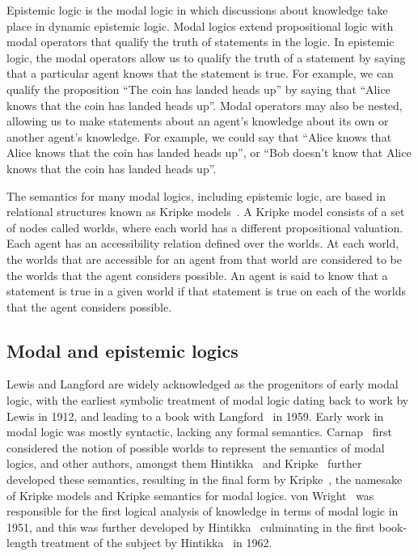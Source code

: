 Epistemic logic is the modal logic in which discussions about knowledge take
place in dynamic epistemic logic. Modal logics extend propositional logic with
modal operators that qualify the truth of statements in the logic. In epistemic
logic, the modal operators allow us to qualify the truth of a statement by
saying that a particular agent knows that the statement is true. For example, we
can qualify the proposition ``The coin has landed heads up'' by saying that
``Alice knows that the coin has landed heads up''. Modal operators may also be
nested, allowing us to make statements about an agent's knowledge about its own
or another agent's knowledge. For example, we could say that ``Alice knows that
Alice knows that the coin has landed heads up'', or ``Bob doesn't know that
Alice knows that the coin has landed heads up''.

The semantics for many modal logics, including epistemic logic, are based in
relational structures known as Kripke models~\cite{kripke:1963,blackburn:2001}. A
Kripke model consists of a set of nodes called worlds, where each world has a
different propositional valuation. Each agent has an accessibility relation
defined over the worlds. At each world, the worlds that are accessible for an
agent from that world are considered to be the worlds that the agent considers
possible. An agent is said to know that a statement is true in a given world if
that statement is true on each of the worlds that the agent considers possible.

\subsection{Modal and epistemic logics}

Lewis and Langford are widely acknowledged as the progenitors of early modal
logic, with the earliest symbolic treatment of modal logic dating back to work
by Lewis in 1912, and leading to a book with Langford~\cite{langford:1959} in
1959. Early work in modal logic was mostly syntactic, lacking any formal
semantics. Carnap~\cite{carnap:1946, carnap:1947} first considered the notion of
possible worlds to represent the semantics of modal logics, and other authors,
amongst them Hintikka~\cite{hintikka:1957, hintikka:1961} and
Kripke~\cite{kripke:1959} further developed these semantics, resulting in the
final form by Kripke~\cite{kripke:1963}, the namesake of Kripke models and Kripke
semantics for modal logics. von Wright~\cite{vonwright:1951} was responsible for
the first logical analysis of knowledge in terms of modal logic in 1951, and
this was further developed by Hintikka~\cite{hintikka:1957,hintikka:1961}
culminating in the first book-length treatment of the subject by
Hintikka~\cite{hintikka:1962} in 1962.

